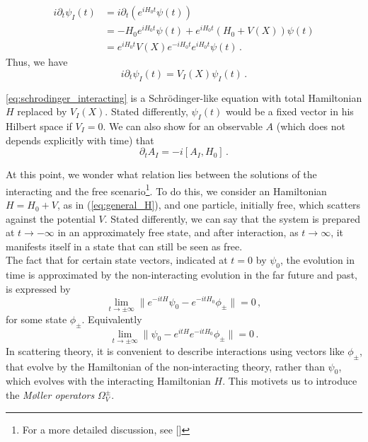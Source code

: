 \begin{equation}
\begin{aligned}
i\partial_t\psi_I(t)&=i\partial_t(e^{iH_0t}\psi(t))\\
&= -H_0e^{iH_0t}\psi(t)+e^{iH_0t}(H_0+V(X))\psi(t)\\
& = e^{iH_0t}V(X)e^{-iH_0t}e^{iH_0t}\psi(t)\,.
\end{aligned}
\end{equation}
Thus, we have
\begin{equation}
 i\partial_t\psi_I(t)=V_I(X)\psi_I(t)\,.
 \label{eq:schrodinger_interacting}
\end{equation}
\begin{oss}
	\eqref{eq:schrodinger_interacting} is a Schr\"{o}dinger-like equation with total Hamiltonian $H$ replaced by $V_I(X)$. Stated differently, $\psi_I(t)$ would be a fixed vector in his Hilbert space if $V_I=0$. We can also show for an observable $A$ (which does not depends explicitly with time) that
	\begin{equation}
		\partial_tA_I=-i[A_I,H_0]\,.
	\end{equation}
\end{oss}
At this point, we wonder what relation lies between the solutions of the interacting and the free scenario\footnote{For a more detailed discussion, see [\citealp[Chap. 13, Sect. 1.5]{more}]}. To do this, we consider an Hamiltonian $H=H_0+V$, as in (\ref{eq:general_H}), and one particle, initially free, which scatters against the potential $V$. Stated differently, we can say that the system is prepared at $t\to-\infty$ in an approximately free state, and after interaction, as $t\to\infty$, it manifests itself in a state that can still be seen as free.\\
The fact that for certain state vectors, indicated at $t=0$ by $\psi_0$, the evolution in time is approximated by the non-interacting evolution in the far future and past, is expressed by
\begin{equation}
	\lim_{t\to\pm\infty}\|e^{-itH}\psi_0-e^{-itH_0}\phi_\pm\|=0\,,
\end{equation}
for some state $\phi_\pm$. Equivalently
\begin{equation}
	\lim_{t\to\pm\infty}\|\psi_0-e^{itH}e^{-itH_0}\phi_\pm\|=0\,.
\end{equation} 
In scattering theory, it is convenient to describe interactions using vectors like $\phi_\pm$, that evolve by the Hamiltonian of the non-interacting theory, rather than $\psi_0$, which evolves with the interacting Hamiltonian $H$. This motivets us to introduce the \textit{M\o{}ller operators} $\Omega^\pm_V$. 
